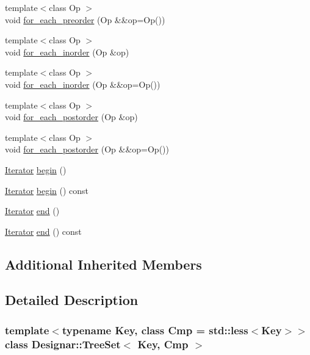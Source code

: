 \begin{DoxyCompactItemize}
\item 
{\footnotesize template$<$class Op $>$ }\\void \hyperlink{class_designar_1_1_tree_set_a45484640b06b18673646c606cf278e08}{for\+\_\+each\+\_\+preorder} (Op \&\&op=Op())
\item 
{\footnotesize template$<$class Op $>$ }\\void \hyperlink{class_designar_1_1_tree_set_af57ef3d8bb57487085079df5b5da4139}{for\+\_\+each\+\_\+inorder} (Op \&op)
\item 
{\footnotesize template$<$class Op $>$ }\\void \hyperlink{class_designar_1_1_tree_set_a0b3e506271289cc4e1e1fa3ce3ae9113}{for\+\_\+each\+\_\+inorder} (Op \&\&op=Op())
\item 
{\footnotesize template$<$class Op $>$ }\\void \hyperlink{class_designar_1_1_tree_set_ab59aacf4ca7cfe6c3753b5c4bd6c45e8}{for\+\_\+each\+\_\+postorder} (Op \&op)
\item 
{\footnotesize template$<$class Op $>$ }\\void \hyperlink{class_designar_1_1_tree_set_ae00442533ecacddca2c61bfbbc2c0c94}{for\+\_\+each\+\_\+postorder} (Op \&\&op=Op())
\item 
\hyperlink{class_designar_1_1_tree_set_1_1_iterator}{Iterator} \hyperlink{class_designar_1_1_tree_set_a2b51174c1290413611f407d54a3e5104}{begin} ()
\item 
\hyperlink{class_designar_1_1_tree_set_1_1_iterator}{Iterator} \hyperlink{class_designar_1_1_tree_set_ae2bb7c7ab6f5079bc8995821aa9bedfb}{begin} () const
\item 
\hyperlink{class_designar_1_1_tree_set_1_1_iterator}{Iterator} \hyperlink{class_designar_1_1_tree_set_a4069f037294163ea3686689c04486c58}{end} ()
\item 
\hyperlink{class_designar_1_1_tree_set_1_1_iterator}{Iterator} \hyperlink{class_designar_1_1_tree_set_a199fd4c6fa4e0ad40be0477fef024d9d}{end} () const
\end{DoxyCompactItemize}
\subsection*{Additional Inherited Members}


\subsection{Detailed Description}
\subsubsection*{template$<$typename Key, class Cmp = std\+::less$<$\+Key$>$$>$\newline
class Designar\+::\+Tree\+Set$<$ Key, Cmp $>$}



